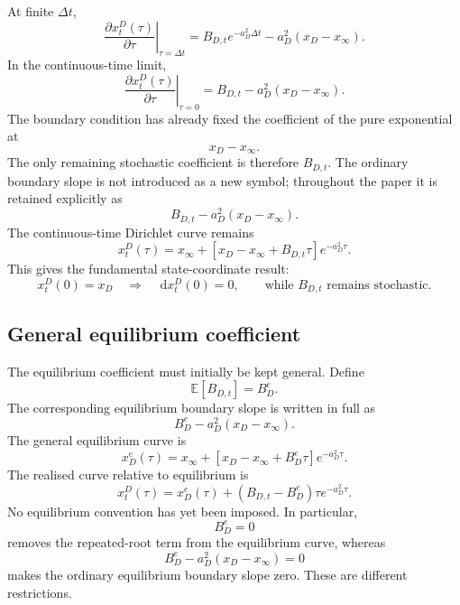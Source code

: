\documentclass[12pt]{article}
\numberwithin{equation}{subsection}
\newcommand{\E}{\mathbb{E}}
\newcommand{\dd}{\,\mathrm{d}}
\begin{document}
At finite $\Delta t$,
\begin{equation}
\left.\frac{\partial x^D_t(\tau)}{\partial\tau}\right|_{\tau=\Delta t}
=
B_{D,t}e^{-a_D^2\Delta t}
-a_D^2(x_D-x_\infty).
\end{equation}
In the continuous-time limit,
\begin{equation}
\left.\frac{\partial x^D_t(\tau)}{\partial\tau}\right|_{\tau=0}
=
B_{D,t}-a_D^2(x_D-x_\infty).
\end{equation}
The boundary condition has already fixed the coefficient of the pure exponential at
\begin{equation}
x_D-x_\infty.
\end{equation}
The only remaining stochastic coefficient is therefore $B_{D,t}$. The ordinary boundary slope is not introduced as a new symbol; throughout the paper it is retained explicitly as
\begin{equation}
B_{D,t}-a_D^2(x_D-x_\infty).
\end{equation}
The continuous-time Dirichlet curve remains
\begin{equation}
x^D_t(\tau)
=
x_\infty+
\left[x_D-x_\infty+B_{D,t}\tau\right]e^{-a_D^2\tau}.
\end{equation}
This gives the fundamental state-coordinate result:
\begin{equation}
x^D_t(0)=x_D
\quad\Longrightarrow\quad
\dd x^D_t(0)=0,
\qquad
\text{while }B_{D,t}\text{ remains stochastic.}
\end{equation}

\subsection{General equilibrium coefficient}

The equilibrium coefficient must initially be kept general. Define
\begin{equation}
\E[B_{D,t}]=B_D^e.
\end{equation}
The corresponding equilibrium boundary slope is written in full as
\begin{equation}
B_D^e-a_D^2(x_D-x_\infty).
\end{equation}
The general equilibrium curve is
\begin{equation}
x_D^e(\tau)
=
x_\infty+
\left[x_D-x_\infty+B_D^e\tau\right]e^{-a_D^2\tau}.
\end{equation}
The realised curve relative to equilibrium is
\begin{equation}
x^D_t(\tau)
=
x_D^e(\tau)
+(B_{D,t}-B_D^e)\tau e^{-a_D^2\tau}.
\end{equation}
No equilibrium convention has yet been imposed. In particular,
\begin{equation}
B_D^e=0
\end{equation}
removes the repeated-root term from the equilibrium curve, whereas
\begin{equation}
B_D^e-a_D^2(x_D-x_\infty)=0
\end{equation}
makes the ordinary equilibrium boundary slope zero. These are different restrictions.
\end{document}
